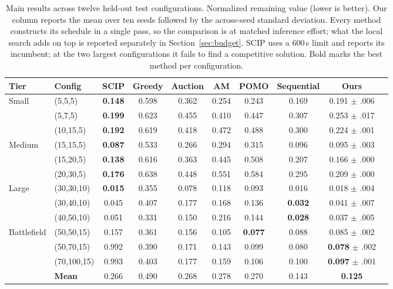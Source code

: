 \begin{table}[t]
\centering
\scriptsize
\caption{Main results across twelve held-out test configurations.
Normalized remaining value (lower is better). Our column reports the mean over ten seeds followed by the across-seed standard deviation. Every method constructs its schedule in a single pass, so the comparison is at matched inference effort; what the local search adds on top is reported separately in Section~\ref{sec:budget}. SCIP uses a 600\,s limit and reports its incumbent; at the two largest configurations it fails to find a competitive solution. Bold marks the best method per configuration.}
\label{tab:main_results}
\begin{tabular}{@{}llcccccccc@{}}
\toprule
Tier & Config & SCIP & Greedy & Auction & AM & POMO & Sequential & Ours \\
\midrule
\multirow{3}{*}{Small}
 & (5,5,5)     & \textbf{0.148} & 0.598 & 0.362 & 0.254 & 0.243 & 0.169 & 0.191 $\pm$ .006 \\
 & (5,7,5)     & \textbf{0.199} & 0.623 & 0.455 & 0.410 & 0.447 & 0.307 & 0.253 $\pm$ .017 \\
 & (10,15,5)   & \textbf{0.192} & 0.619 & 0.418 & 0.472 & 0.488 & 0.300 & 0.224 $\pm$ .001 \\
\midrule
\multirow{3}{*}{Medium}
 & (15,15,5)   & \textbf{0.087} & 0.533 & 0.266 & 0.294 & 0.315 & 0.096 & 0.095 $\pm$ .003 \\
 & (15,20,5)   & \textbf{0.138} & 0.616 & 0.363 & 0.445 & 0.508 & 0.207 & 0.166 $\pm$ .000 \\
 & (20,30,5)   & \textbf{0.176} & 0.638 & 0.448 & 0.551 & 0.584 & 0.295 & 0.209 $\pm$ .000 \\
\midrule
\multirow{3}{*}{Large}
 & (30,30,10)  & \textbf{0.015} & 0.355 & 0.078 & 0.118 & 0.093 & 0.016 & 0.018 $\pm$ .004 \\
 & (30,40,10)  & 0.045 & 0.407 & 0.177 & 0.168 & 0.136 & \textbf{0.032} & 0.041 $\pm$ .007 \\
 & (40,50,10)  & 0.051 & 0.331 & 0.150 & 0.216 & 0.144 & \textbf{0.028} & 0.037 $\pm$ .005 \\
\midrule
\multirow{3}{*}{Battlefield}
 & (50,50,15)  & 0.157 & 0.361 & 0.156 & 0.105 & \textbf{0.077} & 0.088 & 0.085 $\pm$ .002 \\
 & (50,70,15)  & 0.992 & 0.390 & 0.171 & 0.143 & 0.099 & 0.080 & \textbf{0.078} $\pm$ .002 \\
 & (70,100,15) & 0.993 & 0.403 & 0.177 & 0.159 & 0.106 & 0.100 & \textbf{0.097} $\pm$ .001 \\
\midrule
 & \textbf{Mean} & 0.266 & 0.490 & 0.268 & 0.278 & 0.270 & 0.143 & \textbf{0.125} \\
\bottomrule
\end{tabular}
\end{table}

